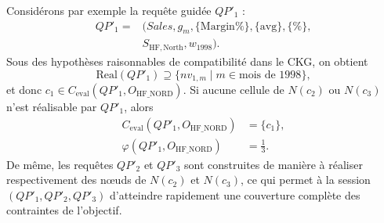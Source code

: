 Considérons par exemple la requête guidée $QP'_1$ :
\[
\begin{aligned}
QP'_1={}&(\textit{Sales},g_m,\{\mathrm{Margin\%}\},\{\mathrm{avg}\},\{\%\},\\
        &S_{\mathrm{HF,North}},w_{1998}).
\end{aligned}
\]
Sous des hypothèses raisonnables de compatibilité dans le CKG, on obtient
\[
\mathrm{Real}(QP'_1)\supseteq \{nv_{1,m}\mid m\in \text{mois de 1998}\},
\]
et donc $c_1\in C_{\mathrm{eval}}(QP'_1,O_{\mathrm{HF\_NORD}})$. Si aucune cellule de $N(c_2)$ ou $N(c_3)$ n'est réalisable par $QP'_1$, alors
\[
\begin{aligned}
C_{\mathrm{eval}}(QP'_1,O_{\mathrm{HF\_NORD}})&=\{c_1\},\\
\varphi(QP'_1,O_{\mathrm{HF\_NORD}})&=\frac{1}{3}.
\end{aligned}
\]
De même, les requêtes $QP'_2$ et $QP'_3$ sont construites de manière à réaliser respectivement des nœuds de $N(c_2)$ et $N(c_3)$, ce qui permet à la session $(QP'_1,QP'_2,QP'_3)$ d'atteindre rapidement une couverture complète des contraintes de l'objectif.
